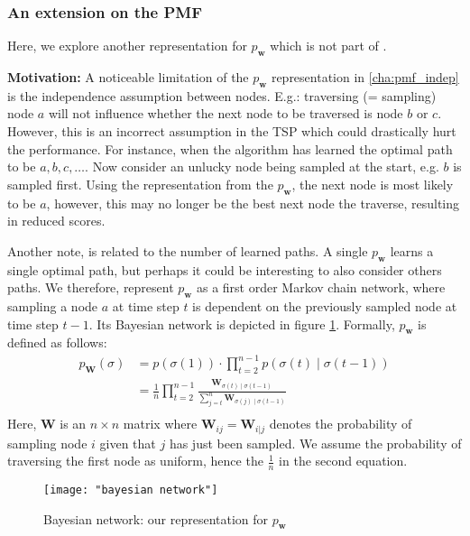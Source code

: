 \documentclass[a4paper,10pt]{article}
\newcommand{\matr}[1]{\mathbf{#1}}
\begin{document}
	\subsubsection{An extension on the PMF}
	Here, we explore another representation for $p_\mathbf{w}$ which is not part of \cite{santucci_gradient_2020, ceberiojosu_model-based_2023}. 
	
	\textbf{Motivation:} A noticeable limitation of the $p_\mathbf{w}$ representation in \ref{cha:pmf_indep} is the independence assumption between nodes. E.g.: traversing (= sampling) node $a$ will not influence whether the next node to be traversed is node $b$ or $c$. However, this is an incorrect assumption in the TSP which could drastically hurt the performance. For instance, when the algorithm has learned the optimal path to be $a, b, c, \dots $. Now consider an unlucky node being sampled at the start, e.g. $b$ is sampled first. Using the representation from the $p_\mathbf{w}$, the next node is most likely to be $a$, however, this may no longer be the best next node the traverse, resulting in reduced scores.
	
	Another note, is related to the number of learned paths. A single $p_\mathbf{w}$ learns a single optimal path, but perhaps it could be interesting to also consider others paths. We therefore, represent $p_\mathbf{w}$ as a first order Markov chain network, where sampling a node $a$ at time step $t$ is dependent on the previously sampled node at time step $t-1$. Its Bayesian network is depicted in figure \ref{fig:bayesian-network}. Formally, $p_\matr{w}$ is defined as follows:
	$$
	\begin{aligned}
		p_\matr{W}(\sigma) &= p\left(\sigma(1)\right) \cdot \prod_{t=2}^{n-1} p\left(\sigma(t) \mid \sigma(t-1) \right) \\
						   &= \frac{1}{n} \prod_{t=2}^{n-1} \frac{\matr{W}_{\sigma(t) \mid \sigma(t-1)}}{\sum_{j=t}^n \matr{W}_{\sigma(j) \mid \sigma(t-1)}} \\
	\end{aligned}
	$$
	Here, $\matr{W}$ is an $n \times n$ matrix where $\matr{W}_{ij} = \matr{W}_{i | j}$ denotes the probability of sampling node $i$ given that $j$ has just been sampled. We assume the probability of traversing the first node as uniform, hence the $\frac{1}{n}$ in the second equation.
	
	\begin{figure}
		\centering
		\texttt{[image: "bayesian network"]}
		\caption{Bayesian network: our representation for $p_\mathbf{w}$}
		\label{fig:bayesian-network}
	\end{figure}
	
\end{document}
